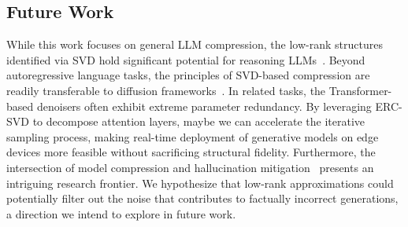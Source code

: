 \subsection{Future Work}
While this work focuses on general LLM compression, the low-rank structures identified via SVD hold significant potential for reasoning LLMs~\cite{jaech2024openai,yang2025qwen3,feng2025efficient}. Beyond autoregressive language tasks, the principles of SVD-based compression are readily transferable to diffusion frameworks~\cite{rombach2022high,zhu2025obs,bai2026dice}. In related tasks, the Transformer-based denoisers often exhibit extreme parameter redundancy. By leveraging ERC-SVD to decompose attention layers, maybe we can accelerate the iterative sampling process, making real-time deployment of generative models on edge devices more feasible without sacrificing structural fidelity. Furthermore, the intersection of model compression and hallucination mitigation~\cite{tonmoy2024comprehensive,zhang2025poison} presents an intriguing research frontier. We hypothesize that low-rank approximations could potentially filter out the noise that contributes to factually incorrect generations, a direction we intend to explore in future work.